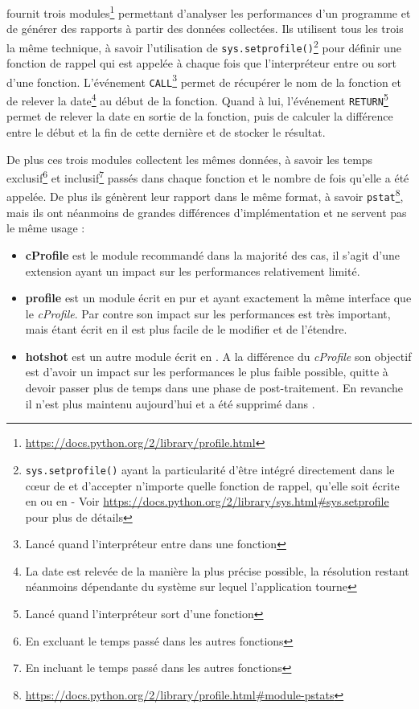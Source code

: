 \Python fournit trois modules\footnote{\url{https://docs.python.org/2/library/profile.html}} permettant d'analyser les performances d'un programme et de générer des rapports à partir des données collectées. Ils utilisent tous les trois la même technique, à savoir l'utilisation de \verb|sys.setprofile()|\footnote{\verb?sys.setprofile()? ayant la particularité d'être intégré directement dans le cœur de \Python et d'accepter n'importe quelle fonction de rappel, qu'elle soit écrite en \C ou en \Python - Voir \url{https://docs.python.org/2/library/sys.html#sys.setprofile} pour plus de détails} pour définir une fonction de rappel qui est appelée à chaque fois que l'interpréteur entre ou sort d'une fonction. 
L'événement \verb|CALL|\footnote{Lancé quand l'interpréteur entre dans une fonction} permet de récupérer le nom de la fonction et de relever la date\footnote{La date est relevée de la manière la plus précise possible, la résolution restant néanmoins dépendante du système sur lequel l'application tourne} au début de la fonction. Quand à lui, l'événement \verb|RETURN|\footnote{Lancé quand l'interpréteur sort d'une fonction} permet de relever la date en sortie de la fonction, puis de calculer la différence entre le début et la fin de cette dernière et de stocker le résultat.

De plus ces trois modules collectent les mêmes données, à savoir les temps exclusif\footnote{En excluant le temps passé dans les autres fonctions} et inclusif\footnote{En incluant le temps passé dans les autres fonctions} passés dans chaque fonction et le nombre de fois qu'elle a été appelée. De plus ils génèrent leur rapport dans le même format, à savoir \verb|pstat|\footnote{\url{https://docs.python.org/2/library/profile.html#module-pstats}}, mais ils ont néanmoins de grandes différences d'implémentation et ne servent pas le même usage : 

\begin{itemize}
\item \textbf{cProfile} est le module recommandé dans la majorité des cas, il s'agit d'une extension \C ayant un impact sur les performances relativement limité.
\item \textbf{profile} est un module écrit en pur \Python et ayant exactement la même interface que le \emph{cProfile}. Par contre son impact sur les performances est très important, mais étant écrit en \Python il est plus facile de le modifier et de l'étendre.
\item \textbf{hotshot} est un autre module écrit en \C. A la différence du \emph{cProfile} son objectif est d'avoir un impact sur les performances le plus faible possible, quitte à devoir passer plus de temps dans une phase de post-traitement. En revanche il n'est plus maintenu aujourd'hui et a été supprimé dans .
\end{itemize}